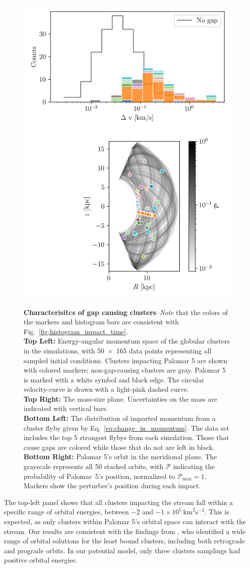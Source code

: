 \documentclass[draft]{aa}
\begin{document}
\begin{figure}
      \includegraphics[width=0.45\linewidth]{impact_geometry_statistics_deltaP.png}
      \includegraphics[width=0.45\linewidth]{impact_stats_phase_space.png}
      \caption{\textbf{Characterisitcs of gap causing clusters}--\textit{Note} that the colors of the markers and histogram bars are consistent with Fig.~\ref{fig:histogram_impact_time}.\\ \textbf{Top Left:} Energy-angular momentum space of the globular clusters in the simulations, with 50~$\times$~165 data points representing all sampled initial conditions. Clusters impacting Palomar 5 are shown with colored markers; non-gap-causing clusters are gray. Palomar 5 is marked with a white symbol and black edge. The circular velocity-curve is drawn with a light-pink dashed curve.\\ \textbf{Top Right:} The mass-size plane. Uncertainties on the mass are indicated with vertical bars. \\ \textbf{Bottom Left:} The distribution of imparted momentum from a cluster flyby given by Eq.~\ref{eq:change_in_momentum}. The data set includes the top 5 strongest flybys from each simulation. Those that cause gaps are colored while those that do not are left in black. \\ \textbf{Bottom Right:} Palomar 5's orbit in the meridional plane. The grayscale represents all 50 stacked orbits, with $\mathcal{P}$ indicating the probability of  Palomar~5's position, normalized to $\mathcal{P}_\textrm{max}=1$. Markers show the perturber's position during each impact.}
      \label{fig:mass_size_plane}
      \end{figure}

    The top-left panel shows that all clusters impacting the stream fall within a specific range of orbital energies, between $-2$ and $-1 \times10^5~\textrm{km}^2\textrm{s}^{-2}$. This is expected, as only clusters within Palomar 5's orbital space can interact with the stream. Our results are consistent with the findings from \citet{2021MNRAS.505.5978V}, who identified a wide range of orbital solutions for the least bound clusters, including both retrograde and prograde orbits. In our potential model, only three clusters samplings had positive orbital energies.
    
\end{document}
